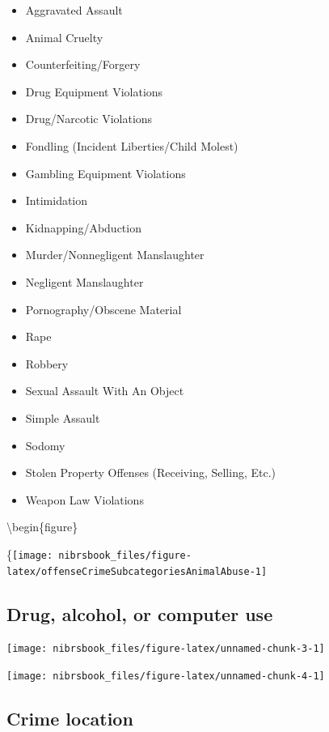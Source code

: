 \documentclass[
  12pt,
  openany]{book}
\providecommand{\tightlist}{%
  \setlength{\itemsep}{0pt}\setlength{\parskip}{0pt}}
\begin{document}
\begin{itemize}
\tightlist
\item
  Aggravated Assault
\item
  Animal Cruelty
\item
  Counterfeiting/Forgery
\item
  Drug Equipment Violations
\item
  Drug/Narcotic Violations
\item
  Fondling (Incident Liberties/Child Molest)
\item
  Gambling Equipment Violations
\item
  Intimidation
\item
  Kidnapping/Abduction
\item
  Murder/Nonnegligent Manslaughter
\item
  Negligent Manslaughter
\item
  Pornography/Obscene Material
\item
  Rape
\item
  Robbery
\item
  Sexual Assault With An Object
\item
  Simple Assault
\item
  Sodomy
\item
  Stolen Property Offenses (Receiving, Selling, Etc.)
\item
  Weapon Law Violations
\end{itemize}

\textbackslash begin\{figure\}

\{\centering \texttt{[image: nibrsbook\_files/figure-latex/offenseCrimeSubcategoriesAnimalAbuse-1]}

\hypertarget{drug-alcohol-or-computer-use}{%
\subsection{Drug, alcohol, or computer use}\label{drug-alcohol-or-computer-use}}

\begin{center}\texttt{[image: nibrsbook\_files/figure-latex/unnamed-chunk-3-1]} \end{center}

\begin{center}\texttt{[image: nibrsbook\_files/figure-latex/unnamed-chunk-4-1]} \end{center}

\hypertarget{crime-location}{%
\subsection{Crime location}\label{crime-location}}
\end{document}
